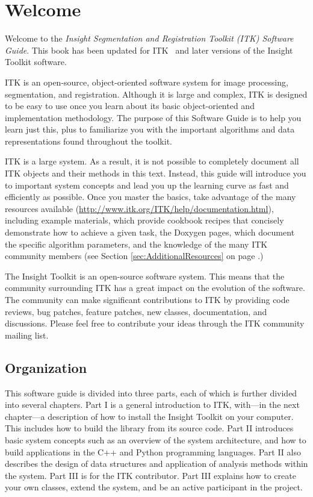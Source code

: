 \chapter{Welcome}
\label{chapter:Introduction}

Welcome to the \emph{Insight Segmentation and Registration Toolkit (ITK)
Software Guide}. This book has been updated for ITK \ITKVERSIONMAJORMINOR
\ and later versions of the Insight Toolkit software.

ITK is an open-source, object-oriented software system for image processing,
segmentation, and registration.  Although it is large and complex, ITK is
designed to be easy to use once you learn about its basic object-oriented and
implementation methodology. The purpose of this Software Guide is
to help you learn just this, plus to familiarize you with the important
algorithms and data representations found throughout the toolkit.

ITK is a large system. As a result, it is not possible to completely document
all ITK objects and their methods in this text. Instead, this guide will
introduce you to important system concepts and lead you up the learning curve
as fast and efficiently as possible. Once you master the basics, take
advantage of the many resources available
(\url{http://www.itk.org/ITK/help/documentation.html}), including example
materials, which provide cookbook recipes that concisely demonstrate how to
achieve a given task, the Doxygen pages, which document the specific algorithm
parameters, and the knowledge of the many ITK community members (see Section
\ref{sec:AdditionalResources} on page \pageref{sec:AdditionalResources}.)

The Insight Toolkit is an open-source software system. This means that the
community surrounding ITK has a great impact on the evolution of the software.
The community can make significant contributions to ITK by providing code
reviews, bug patches, feature patches, new classes, documentation, and
discussions. Please feel free to contribute your ideas through the ITK
community mailing list.

\section{Organization}
\label{sec:Organization}

This software guide is divided into three parts, each of which is further
divided into several chapters. Part I is a general introduction to ITK,
with---in the next chapter---a description of how to install the Insight
Toolkit on your computer. This includes how to build the library from its
source code. Part II introduces basic system concepts such as an overview of
the system architecture, and how to build applications in the C++ and Python
programming languages. Part II also describes the design of data structures
and application of analysis methods within the system.  Part III is for the
ITK contributor. Part III explains how to create your own classes, extend the
system, and be an active participant in the project.

